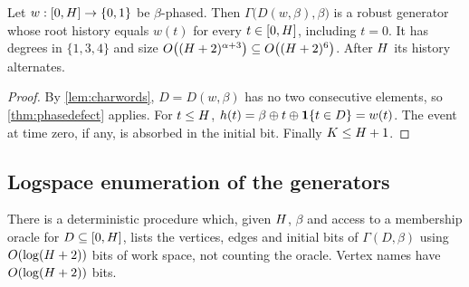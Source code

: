 \begin{corollary}\label{cor:words}
Let $w:[0,H]\to\{0,1\}$ be $\beta$-phased. Then $\Gamma\bigl(D(w,\beta),\beta\bigr)$ is a robust
generator whose root history equals $w(t)$ for every $t\in[0,H]$, including $t=0$. It has degrees
in $\{1,3,4\}$ and size $O\bigl((H+2)^{\alpha+3}\bigr)\subseteq O\bigl((H+2)^6\bigr)$. After $H$
its history alternates.
\end{corollary}

\begin{proof}
By \cref{lem:charwords}, $D=D(w,\beta)$ has no two consecutive elements, so \cref{thm:phasedefect}
applies. For $t\le H$, $h(t)=\beta\oplus t\oplus\mathbf{1}\{t\in D\}=w(t)$. The event at time zero, if any,
is absorbed in the initial bit. Finally $K\le H+1$.
\end{proof}

\subsection{Logspace enumeration of the generators}\label{sec:enum}

\begin{lemma}[Uniformity]\label{lem:genlogspace}
There is a deterministic procedure which, given $H$, $\beta$ and access to a membership oracle for
$D\subseteq[0,H]$, lists the vertices, edges and initial bits of $\Gamma(D,\beta)$ using
$O(\log(H+2))$ bits of work space, not counting the oracle. Vertex names have $O(\log(H+2))$
bits.
\end{lemma}


